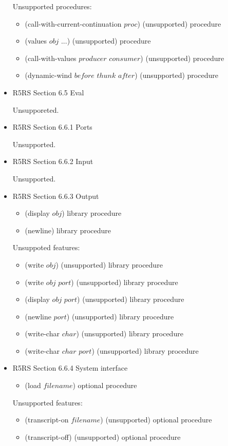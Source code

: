 \documentclass{article}
\begin{document}
\begin{itemize}
	Unsupported procedures:
	\begin{itemize}
		\item (call-with-current-continuation $proc$) (unsupported)	\hfill	procedure
		\item (values $obj$ ...) (unsupported)	\hfill	procedure
		\item (call-with-values $producer$ $consumer$) (unsupported)	\hfill	procedure
		\item (dynamic-wind $before$ $thunk$ $after$) (unsupported)	\hfill	procedure
	\end{itemize}

\item R5RS Section 6.5 Eval
	
	Unsupporeted.
	
\item R5RS Section 6.6.1 Ports
	
	Unsupported.
	
\item R5RS Section 6.6.2 Input
	
	Unsupported.
	
\item R5RS Section 6.6.3 Output	
	\begin{itemize}
		\item (display $obj$)	\hfill	library procedure
		
		\item (newline)	\hfill	library procedure
	\end{itemize}

	Unsuppoted features:
	\begin{itemize}
		\item (write $obj$) (unsupported)	\hfill	library procedure
		\item (write $obj$ $port$) (unsupported)	\hfill	library procedure		
		\item (display $obj$ $port$) (unsupported)	\hfill	library procedure
		\item (newline $port$) (unsupported)	\hfill	library procedure
		\item (write-char $char$) (unsupported)	\hfill	library procedure
		\item (write-char $char$ $port$) (unsupported)	\hfill	library procedure
	\end{itemize}

\item R5RS Section 6.6.4 System interface
	\begin{itemize}
		\item (load $filename$)	\hfill	optional procedure
	\end{itemize}
	
	Unsupported features:
	\begin{itemize}
		\item (transcript-on $filename$) (unsupported)	\hfill	optional procedure
		\item (transcript-off) (unsupported)	\hfill	optional procedure	
	\end{itemize}

\end{itemize}
\end{document}

